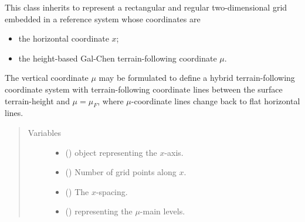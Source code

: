 \documentclass[letterpaper,10pt,english]{sphinxmanual}
\begin{document}
\begin{fulllineitems}
\label{\detokenize{api:grids.gal_chen.GalChen2d}}
This class inherits  to represent a rectangular and regular two-dimensional
grid embedded in a reference system whose coordinates are
\begin{itemize}
\item {} 
the horizontal coordinate \(x\);

\item {} 
the height-based Gal-Chen terrain-following coordinate \(\mu\).

\end{itemize}

The vertical coordinate \(\mu\) may be formulated to define a hybrid terrain-following coordinate system
with terrain-following coordinate lines between the surface terrain-height and \(\mu = \mu_F\), where
\(\mu\)-coordinate lines change back to flat horizontal lines.
\begin{quote}\begin{description}
\item[{Variables}] \leavevmode\begin{itemize}
\item {} 
{\hyperref[\detokenize{api:grids.grid_xyz.GridXYZ.x}]{}} () \textendash{} {\hyperref[\detokenize{api:grids.axis.Axis}]{}} object representing the \(x\)-axis.

\item {} 
{\hyperref[\detokenize{api:grids.grid_xyz.GridXYZ.nx}]{}} () \textendash{} Number of grid points along \(x\).

\item {} 
{\hyperref[\detokenize{api:grids.grid_xyz.GridXYZ.dx}]{}} () \textendash{} The \(x\)-spacing.

\item {} 
 () \textendash{} {\hyperref[\detokenize{api:grids.axis.Axis}]{}} representing the \(\mu\)-main levels.


\end{itemize}
\end{description}
\end{quote}
\end{fulllineitems}
\end{document}
